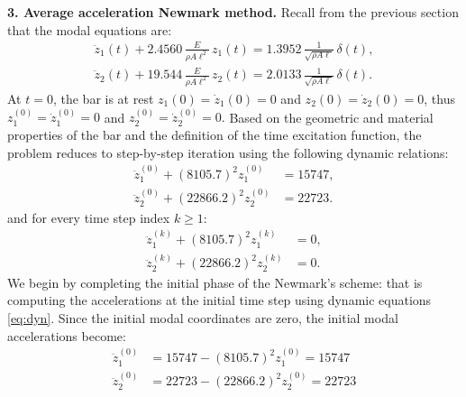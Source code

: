 \documentclass[12pt]{article}
\begin{document}
\textbf{3. Average acceleration Newmark method.} Recall from the previous section that the modal equations are:
\begin{align*}
    \ddot{z}_1(t) +  2.4560 \, \frac{E}{\rho A \ell^2} \, z_1(t) = 1.3952 \, \frac{1}{\sqrt{\rho A \ell}} \, \delta(t), \\
    \ddot{z}_2(t) + 19.544 \, \frac{E}{\rho A \ell^2} \, z_2(t) = 2.0133 \, \frac{1}{\sqrt{\rho A \ell}} \, \delta(t).
\end{align*}
At \( t = 0 \), the bar is at rest $z_1(0) = \dot{z}_1(0) = 0$ and $z_2(0) = \dot{z}_2(0) = 0$, thus $z_1^{(0)} =\dot{z}_1^{(0)}=0$ and $z_2^{(0)}  =\dot{z}_2^{(0)}=0.$
Based on the geometric and material properties of the bar and the definition of the time excitation function, the problem reduces to step-by-step iteration using the following dynamic relations:
\begin{equation}
    \begin{aligned}
        \ddot{z}_1^{(0)} + (8105.7)^2 z_1^{(0)}  & = 15747, \\
        \ddot{z}_2^{(0)} + (22866.2)^2 z_2^{(0)} & = 22723.
    \end{aligned}
    \label{eq:dyn}
\end{equation}
and for every time step index $k\geq 1$:
\begin{equation}
    \begin{aligned}
        \ddot{z}_1^{(k)} + (8105.7)^2 z_1^{(k)}  & = 0, \\
        \ddot{z}_2^{(k)} + (22866.2)^2 z_2^{(k)} & = 0.
    \end{aligned}
    \label{eq:dyn1}
\end{equation}
We begin by completing the initial phase of the Newmark's scheme: that is computing the accelerations at the initial time step using dynamic equations \eqref{eq:dyn}. Since the initial modal coordinates are zero, the initial modal accelerations become:
\begin{align*}
    \ddot{z}_1^{(0)} & = 15747 - (8105.7)^2 z_1^{(0)} = 15747  \\
    \ddot{z}_2^{(0)} & = 22723 - (22866.2)^2 z_2^{(0)} = 22723
\end{align*}
\end{document}
